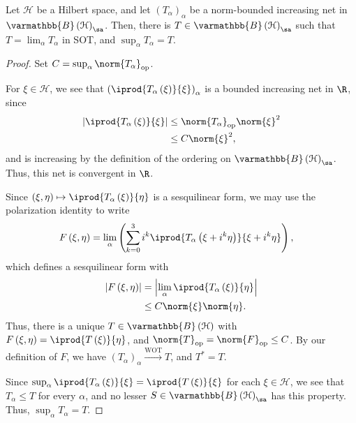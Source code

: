\documentclass[10pt]{mypackage}
\renewcommand*{\mathbb}[1]{\varmathbb{#1}}
\newcommand{\B}{\mathbb{B}}
\begin{document}
\begin{proposition}
  Let $\mathcal{H}$ be a Hilbert space, and let $\left(T_{\alpha}\right)_{\alpha}$ be a norm-bounded increasing net in $\B\left(\mathcal{H}\right)_{\sa}$. Then, there is $T\in \B\left(\mathcal{H}\right)_{\sa}$ such that $T = \lim_{\alpha}T_{\alpha}$ in SOT, and $\sup_{\alpha}T_{\alpha} = T$.
\end{proposition}
\begin{proof}
  Set $C = \sup_{\alpha}\norm{T_{\alpha}}_{\text{op}}$.\newline

  For $\xi\in \mathcal{H}$, we see that $ \left( \iprod{T_{\alpha}\left(\xi\right)}{\xi}\right)_{\alpha}$ is a bounded increasing net in $\R$, since
  \begin{align*}
    \left\vert \iprod{T_{\alpha}\left(\xi\right)}{\xi} \right\vert &\leq \norm{T_{\alpha}}_{\text{op}}\norm{\xi}^2\\
                                                                   &\leq C\norm{\xi}^2,
  \end{align*}
  and is increasing by the definition of the ordering on $\B\left(\mathcal{H}\right)_{\sa}$. Thus, this net is convergent in $\R$. \newline

  Since $\left(\xi,\eta\right)\mapsto \iprod{T_{\alpha}\left(\xi\right)}{\eta}$ is a sesquilinear form, we may use the polarization identity to write
  \begin{align*}
    F\left(\xi,\eta\right) &= \lim_{\alpha} \left( \sum_{k=0}^{3}i^{k} \iprod{T_{\alpha}\left(\xi + i^k\eta\right)}{\xi + i^{k}\eta}\right),
  \end{align*}
  which defines a sesquilinear form with
  \begin{align*}
    \left\vert F\left(\xi,\eta\right) \right\vert &= \left\vert \lim_{\alpha} \iprod{T_{\alpha}\left(\xi\right)}{\eta} \right\vert\\
                                                  &\leq C\norm{\xi}\norm{\eta}.
  \end{align*}
  Thus, there is a unique $T\in \B\left(\mathcal{H}\right)$ with $F\left(\xi,\eta\right) = \iprod{T\left(\xi\right)}{\eta}$, and $\norm{T}_{\text{op}} = \norm{F}_{\text{op}} \leq C$. By our definition of $F$, we have $\left(T_{\alpha}\right)_{\alpha}\xrightarrow{\text{WOT}} T$, and $T^{\ast} = T$.\newline

  Since $\sup_{\alpha} \iprod{T_{\alpha}\left(\xi\right)}{\xi} = \iprod{T\left(\xi\right)}{\xi}$ for each $\xi\in \mathcal{H}$, we see that $T_{\alpha}\leq T$ for every $\alpha$, and no lesser $S\in \B\left(\mathcal{H}\right)_{\sa}$ has this property. Thus, $\sup_{\alpha}T_{\alpha} = T$.\newline


\end{proof}
\end{document}
